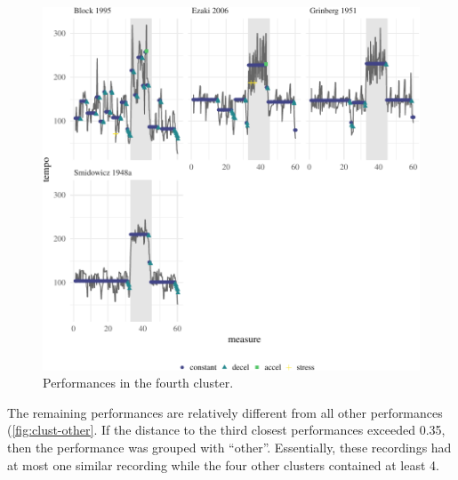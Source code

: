 \documentclass[12pt]{article}
\begin{document}
\begin{figure}

{\centering \includegraphics{gfx/clust-4-1} 

}

\caption{Performances in the fourth cluster.}\label{fig:clust-4}
\end{figure}

The remaining performances are relatively different from all other
performances (\autoref{fig:clust-other}. If the distance to the third
closest performances exceeded 0.35, then the performance was grouped
with ``other''. Essentially, these recordings had at most one similar
recording while the four other clusters contained at least 4.
\end{document}
